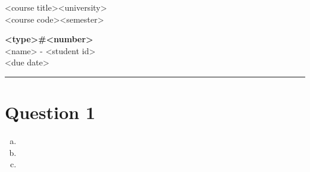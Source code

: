 \documentclass[fleqn, 12pt]{article}
\newcommand{\university}{<university>}
\newcommand{\name}{<name>}
\newcommand{\studentNumber}{<student id>}
\newcommand{\semester}{<semester>}
\newcommand{\assignmentType}{<type>}
\newcommand{\assignemntNumber}{<number>}
\newcommand{\dueDate}{<due date>}
\newcommand{\courseCode}{<course code>}
\newcommand{\courseTitle}{<course title>}
\newcommand{\makeheader}{
    \noindent
    \courseTitle \hfill \university\\
    \courseCode \hfill \semester
    \begin{center}
        \textbf{\assignmentType \#\assignemntNumber}\\
        \name \hspace{1pt} - \studentNumber\\
        \dueDate\\ 
    \end{center}
    \vspace{6pt}
    \hrule
}
\begin{document}
\thispagestyle{firstpage}
\makeheader

\section*{Question 1}

\begin{enumerate}[a)]
    \item 
    \item
    \item
\end{enumerate}
\end{document}
